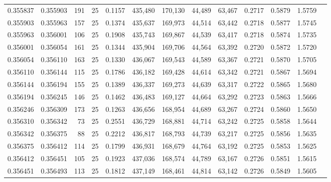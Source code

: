 \begin{tabular}{rrrrrrrrrrrrr}
0.355837 & 0.355903 &   191 &  25 &                                     0.1157 & 435,480 & 170,130 &  44,489 &  63,467 & 0.2717 & 0.5879 & 1.5759 \\
0.355903 & 0.355963 &   157 &  25 &                                     0.1374 & 435,637 & 169,973 &  44,514 &  63,442 & 0.2718 & 0.5877 & 1.5745 \\
0.355963 & 0.356001 &   106 &  25 &                                     0.1908 & 435,743 & 169,867 &  44,539 &  63,417 & 0.2718 & 0.5874 & 1.5735 \\
0.356001 & 0.356054 &   161 &  25 &                                     0.1344 & 435,904 & 169,706 &  44,564 &  63,392 & 0.2720 & 0.5872 & 1.5720 \\
0.356054 & 0.356110 &   163 &  25 &                                     0.1330 & 436,067 & 169,543 &  44,589 &  63,367 & 0.2721 & 0.5870 & 1.5705 \\
0.356110 & 0.356144 &   115 &  25 &                                     0.1786 & 436,182 & 169,428 &  44,614 &  63,342 & 0.2721 & 0.5867 & 1.5694 \\
0.356144 & 0.356194 &   155 &  25 &                                     0.1389 & 436,337 & 169,273 &  44,639 &  63,317 & 0.2722 & 0.5865 & 1.5680 \\
0.356194 & 0.356245 &   146 &  25 &                                     0.1462 & 436,483 & 169,127 &  44,664 &  63,292 & 0.2723 & 0.5863 & 1.5666 \\
0.356246 & 0.356309 &   173 &  25 &                                     0.1263 & 436,656 & 168,954 &  44,689 &  63,267 & 0.2724 & 0.5860 & 1.5650 \\
0.356310 & 0.356342 &    73 &  25 &                                     0.2551 & 436,729 & 168,881 &  44,714 &  63,242 & 0.2725 & 0.5858 & 1.5644 \\
0.356342 & 0.356375 &    88 &  25 &                                     0.2212 & 436,817 & 168,793 &  44,739 &  63,217 & 0.2725 & 0.5856 & 1.5635 \\
0.356375 & 0.356412 &   114 &  25 &                                     0.1799 & 436,931 & 168,679 &  44,764 &  63,192 & 0.2725 & 0.5853 & 1.5625 \\
0.356412 & 0.356451 &   105 &  25 &                                     0.1923 & 437,036 & 168,574 &  44,789 &  63,167 & 0.2726 & 0.5851 & 1.5615 \\
0.356451 & 0.356493 &   113 &  25 &                                     0.1812 & 437,149 & 168,461 &  44,814 &  63,142 & 0.2726 & 0.5849 & 1.5605 \\

\end{tabular}

